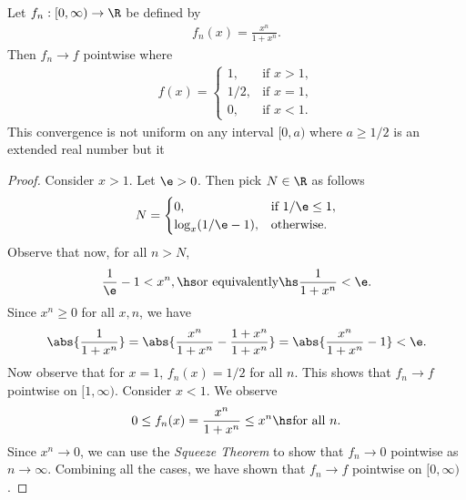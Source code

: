 \documentclass{article}
\begin{document}
\begin{claim*}
   Let $f_n:[0,\infty)\to\R$ be defined by 
   \begin{align*}
      f_n(x) = \frac{x^n}{1+x^n}.
   \end{align*}
   Then $f_n\to f$ pointwise where 
   \begin{align*}
      f(x) = \begin{cases}
         1, &\text{if }x > 1,\\
         1/2, &\text{if }x = 1, \\
         0, &\text{if }x < 1.
      \end{cases}
   \end{align*}
   This convergence is not uniform on any interval $[0, a)$ where
   $a\geq 1/2$ is an extended real number but it 
\end{claim*}
\begin{proof}
   Consider $x>1$. Let $\e>0$. Then pick $N\in\R$ as follows
   \begin{align*}
      N = \begin{cases}
         0, &\text{if }1/\e \leq 1,\\
         \log_x(1/\e-1), &\text{otherwise.}
      \end{cases} 
   \end{align*} 
   Observe that now, for all $n>N$, 
   \begin{align*}
      \frac{1}{\e} - 1 < x^n,
      \hs\text{or equivalently}\hs
      \frac{1}{1+x^n}< \e.
   \end{align*}
   Since $x^n\geq 0$ for all $x,n$, we have
   \begin{align*}
      \abs{\frac{1}{1+x^n}}=\abs{\frac{x^n}{1+x^n}-\frac{1+x^n}{1+x^n}}
      =\abs{\frac{x^n}{1+x^n}-1}<\e.
   \end{align*}
   Now observe that for $x=1$, $f_n(x)=1/2$ for all $n$.
   This shows that $f_n\to f$ pointwise on $[1,\infty)$. Consider $x<1$.
   We observe
   \begin{align*}
      0 \leq f_n(x)=\frac{x^n}{1 + x^n} \leq x^n\hs\text{for all }n.
   \end{align*}
   Since $x^n\to 0$, we can use the \emph{Squeeze Theorem} to show that
   $f_n\to 0$ pointwise as $n\to\infty$. Combining all the cases, we have shown that
   $f_n\to f$ pointwise on $[0, \infty)$.
   
\end{proof}
\end{document}
